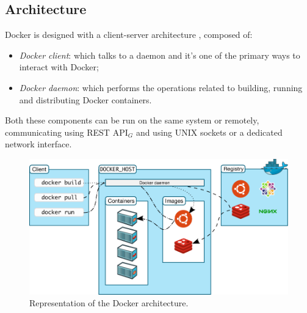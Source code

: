 \subsection{Architecture}
Docker is designed with a client-server architecture \cite{site:docker-overview}, composed of:
\begin{itemize}
	\item \textit{Docker client}: which talks to a daemon and it's one of the primary ways to interact with Docker;
	\item \textit{Docker daemon}: which performs the operations related to building, running and distributing Docker containers.
\end{itemize}
Both these components can be run on the same system or remotely, communicating using REST API$_G$ and using UNIX sockets or a dedicated network interface.
\begin{figure}[h!]
	\centering
	\includegraphics[width=1\linewidth]{"immagini/Technologies/Docker architecture"}
	\caption[Representation of the Docker architecture.]{Representation of the Docker architecture.}
	\label{fig:docker-architecture}
\end{figure}



